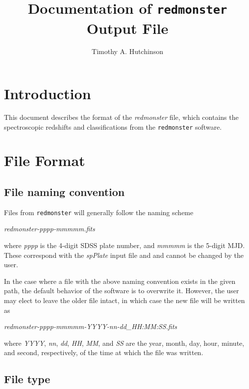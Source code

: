 \documentclass[12pt]{article}
\begin{document}
\title{Documentation of \texttt{redmonster} Output File}

\author{Timothy A. Hutchinson}

\maketitle

\section{Introduction}

This document describes the format of the \textit{redmonster} file,
which contains the spectroscopic redshifts and classifications from
the \texttt{redmonster} software.

\section{File Format}

\subsection{File naming convention}

Files from \texttt{redmonster} will generally follow the naming scheme

\hspace*{36pt}\textit{redmonster-pppp-mmmmm.fits}

where \textit{pppp} is the 4-digit SDSS plate number, and \textit{mmmmm}
is the 5-digit MJD.  These correspond with the \textit{spPlate} input file and
and cannot be changed by the user.

In the case where a file with the above naming convention exists in the given path, 
the default behavior of the software is to overwrite it.  However, the user may 
elect to leave the older file intact, in which case the new file will be written as

\hspace*{36pt}\textit{redmonster-pppp-mmmmm-YYYY-nn-dd\_HH:MM:SS.fits}

where \textit{YYYY}, \textit{nn}, \textit{dd}, \textit{HH}, \textit{MM}, and \textit{SS}
are the year, month, day, hour, minute, and second, respectively, of the time at which
the file was written.

\subsection{File type}
\end{document}
